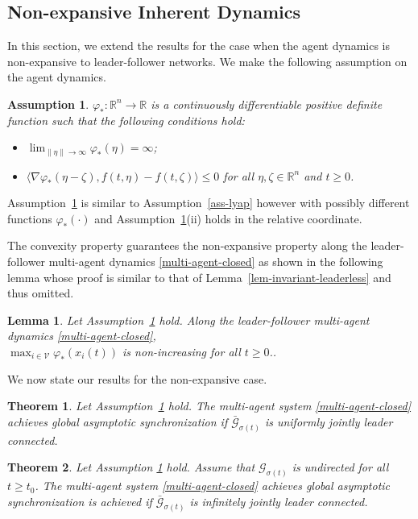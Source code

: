 \documentclass[a4paper, 11pt]{article}
\newtheorem{theorem}{Theorem}
\newtheorem{assumption}{Assumption}
\newtheorem{lemma}{Lemma}
\def\R{\mathbb{R}}
\begin{document}
\subsection{Non-expansive Inherent Dynamics}
In this section, we extend the results for the case when the agent dynamics is non-expansive to leader-follower networks. We make the following assumption on the agent dynamics.
\begin{assumption}\label{ass-lyap-lf}
$\varphi_\ast: {\R}^n \rightarrow \R$ is a continuously differentiable positive definite function
such that the following conditions hold:
\begin{itemize}
\item[(i).] $\lim_{\|\eta\| \rightarrow \infty}\varphi_\ast(\eta)=\infty$;
\item[(ii).] $\langle \nabla \varphi_\ast(\eta-\zeta), f(t,\eta)-f(t,\zeta) \rangle \leq 0$ for all $\eta,\zeta \in {\R}^n$ and $t \geq 0$.
\end{itemize}
\end{assumption}
Assumption~\ref{ass-lyap-lf} is similar to Assumption~\ref{ass-lyap} however with possibly different functions $\varphi_*(\cdot)$  and Assumption~\ref{ass-lyap-lf}(ii) holds in the relative coordinate.

The convexity property guarantees the non-expansive property along the leader-follower multi-agent dynamics \eqref{multi-agent-closed} as shown in the following lemma whose proof is similar to that of Lemma~\ref{lem-invariant-leaderless} and thus omitted.
\begin{lemma}\label{lem-invariant}
Let Assumption~\ref{ass-lyap-lf} hold. Along the leader-follower multi-agent dynamics \eqref{multi-agent-closed},\\ 
$\max_{i \in \mathcal{V}} \varphi_\ast(x_i(t))$ is non-increasing for all $t \geq 0$..
\end{lemma}

We now state our results for the non-expansive case.

\begin{theorem}\label{thm1-leader}
Let Assumption~\ref{ass-lyap-lf} hold.
The multi-agent system \eqref{multi-agent-closed} achieves global asymptotic synchronization if $\bar{\mathcal{G}}_{\sigma(t)}$ is uniformly jointly leader connected.
\end{theorem}

\begin{theorem}\label{thm2-leader}
Let Assumption \ref{ass-lyap-lf} hold.
Assume that $\mathcal{G}_{\sigma(t)}$ is undirected for all $t \geq t_0$.
The multi-agent system \eqref{multi-agent-closed} achieves global asymptotic synchronization is achieved if $\bar{\mathcal{G}}_{\sigma(t)}$ is infinitely jointly leader connected.
\end{theorem}
\end{document}
